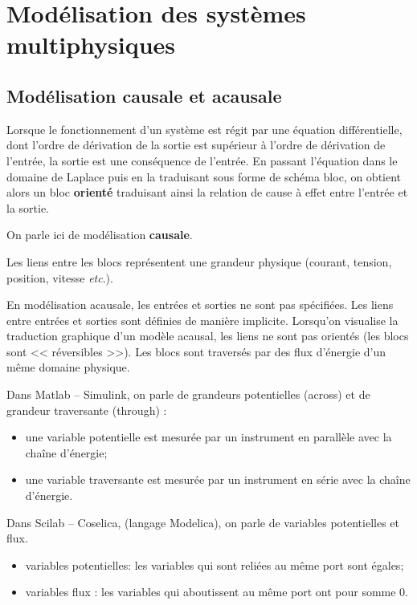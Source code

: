\documentclass[10pt,fleqn]{article} %
\begin{document}
\newpage

\section{Modélisation des systèmes multiphysiques}
\subsection{Modélisation causale et acausale}

\begin{multicols}{2}
Lorsque le fonctionnement d'un système est régit par une équation différentielle, dont l'ordre de dérivation de la sortie est supérieur à l'ordre de dérivation de l'entrée, la sortie est une conséquence de l'entrée. En passant l'équation dans le domaine de Laplace puis en la traduisant sous forme de schéma bloc, on obtient alors un bloc \textbf{orienté} traduisant ainsi la relation de cause à effet entre l'entrée et la sortie. 

On parle ici de modélisation \textbf{causale}. 

Les liens entre les blocs représentent une grandeur physique (courant, tension, position, vitesse \textit{etc}.).

\vfill\null
\columnbreak

En modélisation acausale, les entrées et sorties ne sont pas spécifiées. Les liens entre entrées et sorties sont définies de manière implicite. Lorsqu'on visualise la traduction graphique d'un modèle acausal, les liens ne sont pas orientés (les blocs sont << réversibles >>). Les blocs sont traversés par des flux d'énergie d'un même domaine physique.  

Dans Matlab -- Simulink, on parle de grandeurs potentielles (across) et de grandeur traversante (through) : 
\begin{itemize}
\item une variable potentielle est mesurée par un instrument
en parallèle avec la chaîne d’énergie;
\item une variable traversante est mesurée par un instrument
en série avec la chaîne d’énergie.
\end{itemize}

Dans Scilab -- Coselica, (langage Modelica), on parle de variables potentielles et flux.
\begin{itemize}
\item variables potentielles: les variables qui sont reliées au même port sont égales;
\item variables flux : les variables qui aboutissent au
même port ont pour somme 0.
\end{itemize}
\end{multicols}
\end{document}
